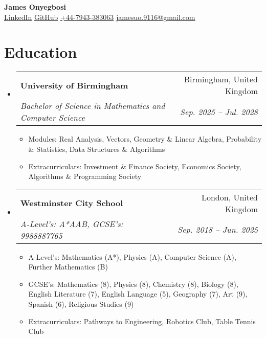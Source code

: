 \documentclass[letterpaper,11pt]{article}
\makeatletter
\newcommand{\resumeItem}[1]{
    \item\small{
        {#1 \vspace{-2pt}}
    }
}
\newcommand{\resumeSubheading}[4]{
    \vspace{-1pt}\item
        \begin{tabular*}{0.97\textwidth}[t]{l@{\extracolsep{\fill}}r}
            \textbf{#1} & #2 \\
            \textit{\small#3} & \textit{\small #4} \\
        \end{tabular*}\vspace{-5pt}
}
\newcommand{\resumeSubHeadingListStart}{\begin{itemize}[leftmargin=0.15in, label={}]}
\newcommand{\resumeSubHeadingListEnd}{\end{itemize}}
\newcommand{\resumeItemListStart}{\begin{itemize}}
\newcommand{\resumeItemListEnd}{\end{itemize}\vspace{-5pt}}
\makeatother
\begin{document}
\begin{center}
    \textbf{\Large James Onyegbosi} \\[1.5pt]
    \small
    \href{www.linkedin.com/in/james-onyegbosi-b04365270}{\underline{LinkedIn}} \textbar \hspace{1pt}
    \href{https://github.com/j4m3su0}{\underline{GitHub}} \textbar \hspace{1pt}
    \href{tel:+447943383063}{\underline{+44-7943-383063}} \textbar \hspace{1pt}
    \href{mailto:jamesuo.9116@gmail.com}{\underline{jamesuo.9116@gmail.com}}
\end{center}


\section{Education}
    \resumeSubHeadingListStart
        \resumeSubheading
            {University of Birmingham}{Birmingham, United Kingdom}
            {Bachelor of Science in Mathematics and Computer Science}{Sep. 2025 -- Jul. 2028}
            \resumeItemListStart
                \resumeItem{Modules: Real Analysis, Vectors, Geometry \& Linear Algebra, Probability \& Statistics, Data Structures \& Algorithms}
                \resumeItem{Extracurriculars: Investment \& Finance Society, Economics Society, Algorithms \& Programming Society}
            \resumeItemListEnd    
        \resumeSubheading
            {Westminster City School}{London, United Kingdom}
            {A-Level's: A*AAB, GCSE's: 9988887765}{Sep. 2018 -- Jun. 2025}
            \resumeItemListStart
                \resumeItem{A-Level's: Mathematics (A*), Physics (A), Computer Science (A), Further Mathematics (B)}
                \resumeItem{GCSE's: Mathematics (8), Physics (8), Chemistry (8), Biology (8), English Literature (7), English Language (5), Geography (7), Art (9), Spanish (6), Religious Studies (9)}
                \resumeItem{Extracurriculars: Pathways to Engineering, Robotics Club, Table Tennis Club}
            \resumeItemListEnd
    \resumeSubHeadingListEnd


\end{document}
